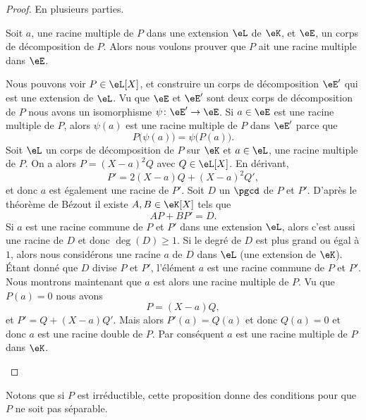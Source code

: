 \begin{proof}
	En plusieurs parties.
	\begin{subproof}
		\spitem[\ref{ItemdqPFUi}\( \Rightarrow\)\ref{ItemdqPFUib}] Soit \( a\), une racine multiple de \( P\) dans une extension \( \eL\) de \( \eK\), et \( \eE\), un corps de décomposition de \( P\). Alors nous voulons prouver que \( P\) ait une racine multiple dans \( \eE\).

		Nous pouvons voir \( P\in \eL[X]\), et construire un corps de décomposition \( \eE'\) qui est une extension de \( \eL\). Vu que \( \eE\) et \( \eE'\) sont deux corps de décomposition de \( P\)
		nous avons un isomorphisme \( \psi\colon \eE'\to \eE\). Si \( a\in \eE\) est une racine multiple de \( P\), alors \( \psi(a)\) est une racine multiple de \( P\) dans \( \eE'\) parce que
		\begin{equation}
			P\big( \psi(a) \big)=\psi\big( P(a) \big).
		\end{equation}
		\spitem[\ref{ItemdqPFUib}\( \Rightarrow\)\ref{ItemdqPFUii}] Soit \( \eL\) un corps de décomposition de \( P\) sur \( \eK\) et \( a\in \eL\), une racine multiple de \( P\). On a alors \( P=(X-a)^2Q\) avec \( Q\in \eL[X]\). En dérivant,
		\begin{equation}
			P'=2(X-a)Q+(X-a)^2Q',
		\end{equation}
		et donc \( a\) est également une racine de \( P'\).
		\spitem[\ref{ItemdqPFUii}\( \Rightarrow\)\ref{ItemdqPFUiii}] Soit \( D\) un \( \pgcd\) de \( P\) et \( P'\). D'après le théorème de Bézout il existe \( A,B\in \eK[X]\) tels que
		\begin{equation}
			AP+BP'=D.
		\end{equation}
		Si \( a\) est une racine commune de \( P\) et \( P'\) dans une extension \( \eL\), alors c'est aussi une racine de \( D\) et donc \( \deg(D)\geq 1\).
		\spitem[\ref{ItemdqPFUiii}\(\Rightarrow\)\ref{ItemdqPFUi}] Si le degré de \( D\) est plus grand ou égal à \( 1\), alors nous considérons une racine \( a\) de \( D\) dans \( \eL\) (une extension de \( \eK\)). Étant donné que \( D\) divise \( P\) et \( P'\), l'élément \( a\) est une racine commune de \( P\) et \( P'\). Nous montrons maintenant que \( a\) est alors une racine multiple de \( P\). Vu que \( P(a)=0\) nous avons
		\begin{equation}
			P=(X-a)Q,
		\end{equation}
		et \( P'=Q+(X-a)Q'\). Mais alors \( P'(a)=Q(a)\) et donc \( Q(a)=0\) et donc \( a\) est une racine double de \( P\). Par conséquent \( a\) est une racine multiple de \( P\) dans \( \eK\).
	\end{subproof}
\end{proof}
Notons que si \( P\) est irréductible, cette proposition donne des conditions pour que \( P\) ne soit pas séparable.

